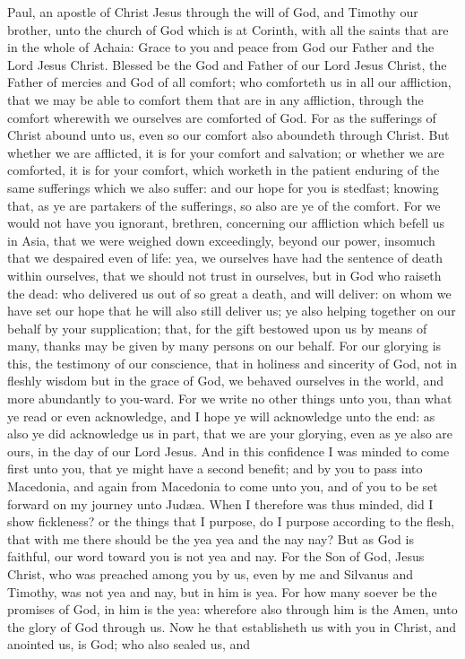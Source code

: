 


Paul, an apostle of Christ Jesus through the will of God, and Timothy our brother, unto the church of God which is at Corinth, with all the saints that are in the whole of Achaia: Grace to you and peace from God our Father and the Lord Jesus Christ.  Blessed be the God and Father of our Lord Jesus Christ, the Father of mercies and God of all comfort; who comforteth us in all our affliction, that we may be able to comfort them that are in any affliction, through the comfort wherewith we ourselves are comforted of God. For as the sufferings of Christ abound unto us, even so our comfort also aboundeth through Christ. But whether we are afflicted, it is for your comfort and salvation; or whether we are comforted, it is for your comfort, which worketh in the patient enduring of the same sufferings which we also suffer: and our hope for you is stedfast; knowing that, as ye are partakers of the sufferings, so also are ye of the comfort. For we would not have you ignorant, brethren, concerning our affliction which befell us in Asia, that we were weighed down exceedingly, beyond our power, insomuch that we despaired even of life: yea, we ourselves have had the sentence of death within ourselves, that we should not trust in ourselves, but in God who raiseth the dead: who delivered us out of so great a death, and will deliver: on whom we have set our hope that he will also still deliver us; ye also helping together on our behalf by your supplication; that, for the gift bestowed upon us by means of many, thanks may be given by many persons on our behalf.  For our glorying is this, the testimony of our conscience, that in holiness and sincerity of God, not in fleshly wisdom but in the grace of God, we behaved ourselves in the world, and more abundantly to you-ward. For we write no other things unto you, than what ye read or even acknowledge, and I hope ye will acknowledge unto the end: as also ye did acknowledge us in part, that we are your glorying, even as ye also are ours, in the day of our Lord Jesus.  And in this confidence I was minded to come first unto you, that ye might have a second benefit; and by you to pass into Macedonia, and again from Macedonia to come unto you, and of you to be set forward on my journey unto Judæa. When I therefore was thus minded, did I show fickleness? or the things that I purpose, do I purpose according to the flesh, that with me there should be the yea yea and the nay nay? But as God is faithful, our word toward you is not yea and nay. For the Son of God, Jesus Christ, who was preached among you by us, even by me and Silvanus and Timothy, was not yea and nay, but in him is yea. For how many soever be the promises of God, in him is the yea: wherefore also through him is the Amen, unto the glory of God through us. Now he that establisheth us with you in Christ, and anointed us, is God; who also sealed us, and 